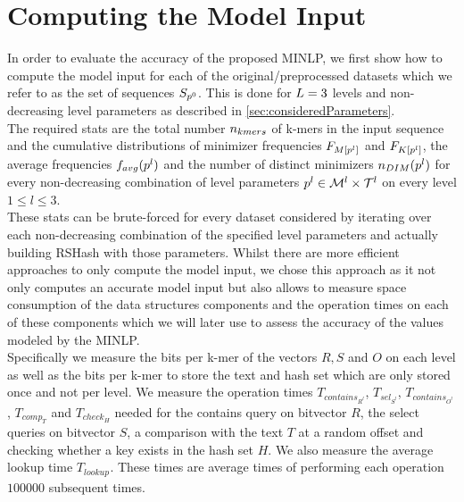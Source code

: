 \documentclass[a4paper,titlepage,onecolumn,oneside,12pt,nenglish,titlepage=firstiscover]{scrbook}
\theoremstyle{plain} %
\theoremstyle{definition} %
\theoremstyle{remark} %
\theoremstyle{plain}
\newcommand{\level}{l}
\newcommand{\contains}{contains}
\newcommand{\select}{sel}
\newcommand{\compare}{comp}
\newcommand{\timeForOperationOnStructure}[2]{T_{#1_{#2}}} %
\newcommand{\averageFrequency}{f_{avg}}
\newcommand{\possibleMinimizerLengths}{\mathcal{M}}
\newcommand{\possibleThresholds}{\mathcal{T}}
\begin{document}
\section{Computing the Model Input} \label{sec:computationOfModelInput}
In order to evaluate the accuracy of the proposed MINLP, we first show how to compute the model input for each of the original/preprocessed datasets which we refer to as the set of sequences $S_{p^{0}}$. This is done for ${L} = 3$ levels and non-decreasing level parameters as described in \cref{sec:consideredParameters}.\\
The required stats are the total number $n_{kmers}$ of k-mers in the input sequence and the cumulative distributions of minimizer frequencies $\CDF{\compactZV{M}{\levelParameters{\level}}}$ and $\CDF{\compactZV{K}{\levelParameters{\level}}}$, the average frequencies $\averageFrequency(\levelParameters{\level})$ and the number of distinct \infrequent minimizers $\numberOfDistinctMinimizers{\levelParameters{\level}}$ for every non-decreasing combination of level parameters $\levelParameters{\level} \in \possibleMinimizerLengths^\level \times \possibleThresholds^\level$ on every level $1 \leq \level \leq 3$.\\

These stats can be brute-forced for every dataset considered by iterating over each non-decreasing combination of the specified level parameters and actually building RSHash with those parameters. Whilst there are more efficient approaches to only compute the model input, we chose this approach as it not only computes an accurate model input but also allows to measure space consumption of the data structures components and the operation times on each of these components which we will later use to assess the accuracy of the values modeled by the MINLP.\\
Specifically we measure the bits per k-mer of the vectors $R, S$ and $O$ on each level as well as the bits per k-mer to store the text and hash set which are only stored once and not per level. We measure the operation times
$\timeForOperationOnStructure{\contains}{R^l}$,
$\timeForOperationOnStructure{\select}{S^l}$,
$\timeForOperationOnStructure{\contains}{O^l}$,
$\timeForOperationOnStructure{\compare}{T}$ and
$\timeForOperationOnStructure{check}{H}$
needed for the contains query on bitvector $R$, the select queries on bitvector $S$, a comparison with the text $T$ at a random offset and checking whether a key exists in the hash set $H$. We also measure the average lookup time $\timeForOperationOnStructure{lookup}{}$. These times are average times of performing each operation $100000$ subsequent times.
\end{document}
